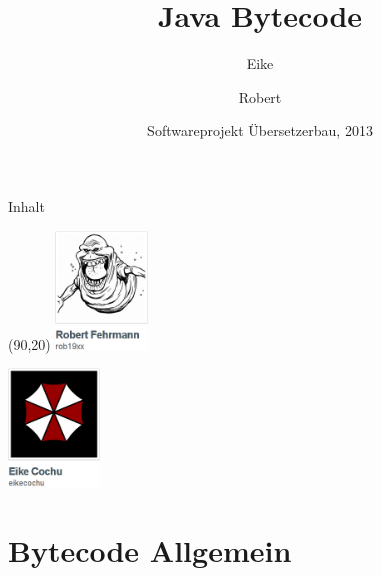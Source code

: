 \documentclass[10pt]{beamer}
\title[Bytecode] %
{Java Bytecode}
\author[Author, Another] %
{Eike \and Robert}
\institute[FU Berlin] %
{Freie Universität Berlin}
\date[Übersetzerbau 2013] %
{Softwareprojekt Übersetzerbau, 2013}
\begin{document}

\begin{frame}[plain]
\titlepage
\end{frame}


\begin{frame}{Inhalt}
\tableofcontents
\begin{textblock}{20}(90,20)
\includegraphics[width=2.45cm]{github_robert.png}

\includegraphics[width=2.445cm]{github_eike.png}
\end{textblock}
\end{frame}


\section{Bytecode Allgemein}
\end{document}
